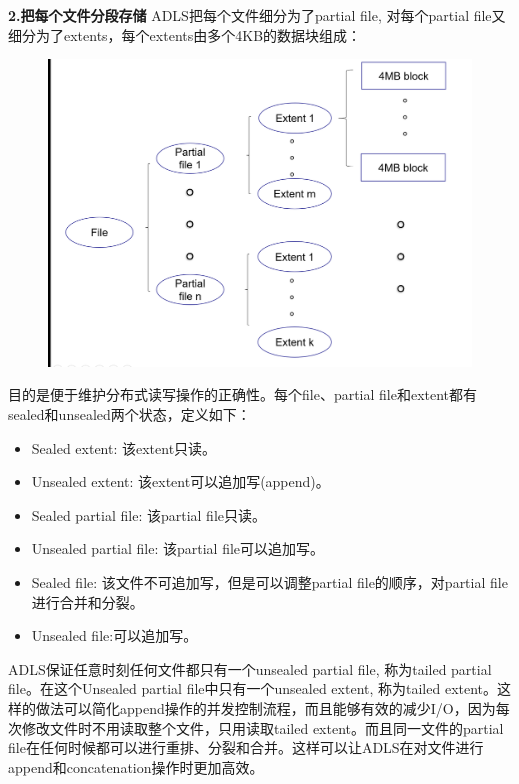 \documentclass[11pt]{article}
\begin{document}
\textbf{2.把每个文件分段存储}
ADLS把每个文件细分为了partial file, 对每个partial file又细分为了extents，每个extents由多个4KB的数据块组成：
\begin{figure}[H]
\includegraphics[width=\linewidth]{figs/file_store.png}
\label{fig1}
\end{figure}
目的是便于维护分布式读写操作的正确性。每个file、partial file和extent都有sealed和unsealed两个状态，定义如下：
\begin{itemize}
	\item Sealed extent: 该extent只读。
	\item Unsealed extent: 该extent可以追加写(append)。
	\item Sealed partial file: 该partial file只读。
	\item Unsealed partial file: 该partial file可以追加写。
	\item Sealed file: 该文件不可追加写，但是可以调整partial file的顺序，对partial file进行合并和分裂。
	\item Unsealed file:可以追加写。
\end{itemize}
ADLS保证任意时刻任何文件都只有一个unsealed partial file, 称为tailed partial file。在这个Unsealed partial file中只有一个unsealed extent, 称为tailed extent。这样的做法可以简化append操作的并发控制流程，而且能够有效的减少I/O，因为每次修改文件时不用读取整个文件，只用读取tailed extent。而且同一文件的partial file在任何时候都可以进行重排、分裂和合并。这样可以让ADLS在对文件进行append和concatenation操作时更加高效。
\end{document}
